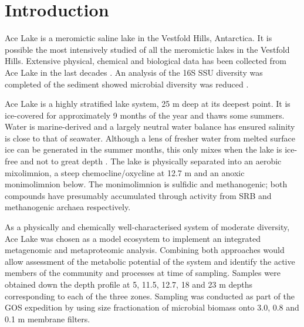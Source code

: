 \section{Introduction}
Ace Lake is a meromictic saline lake in the Vestfold Hills, Antarctica. 
It is possible the most intensively studied of all the meromictic lakes in the Vestfold Hills.
Extensive physical, chemical and biological data has been collected from Ace Lake in the last decades \cite{Rankin1999}.
An analysis of the 16S \ac{SSU} diversity was completed of the sediment showed microbial diversity was reduced \cite{Bowman2000a}.

Ace Lake is a highly stratified lake system, 25 m deep at its deepest point.
It is ice-covered for approximately 9 months of the year and thaws some summers. %
Water is marine-derived and a largely neutral water balance has ensured salinity is close to that of seawater.
Although a lens of fresher water from melted surface ice can be generated in the summer months, this only mixes when the lake is ice-free and not to great depth \cite{Rankin1999}.
The lake is physically separated into an aerobic mixolimnion, a steep chemocline/oxycline at 12.7 m and an anoxic monimolimnion below.
The monimolimnion is sulfidic and methanogenic; both compounds have presumably accumulated through activity from \ac{SRB} and methanogenic archaea respectively.

As a physically and chemically well-characterised system of moderate diversity, Ace Lake was chosen as a model ecosystem to implement an integrated metagenomic and metaproteomic analysis.
Combining both approaches would allow assessment of the metabolic potential of the system and identify the active members of the community and processes at time of sampling.
Samples were obtained down the depth profile at 5, 11.5, 12.7, 18 and 23 m depths corresponding to each of the three zones.
Sampling was conducted as part of the \ac{GOS} expedition \cite{Rusch2007} by using size fractionation of microbial biomass onto 3.0, 0.8 and 0.1 \textmu{}m membrane filters.

